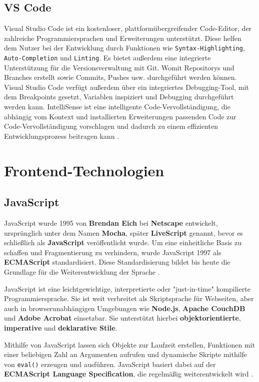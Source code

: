 \documentclass[oneside]{ausarbeitung}
\begin{document}
\subsection{VS Code}
Visual Studio Code ist ein kostenloser, plattformübergreifender Code-Editor, der zahlreiche Programmiersprachen und Erweiterungen unterstützt. Diese helfen dem Nutzer bei der Entwicklung durch Funktionen wie \texttt{Syntax-Highlighting}, \texttt{Auto-Completion} und \texttt{Linting}.
Es bietet außerdem eine integrierte Unterstützung für die Versionsverwaltung mit Git. Womit Repositorys und Branches erstellt sowie Commits, Pushes usw. durchgeführt werden können.
Visual Studio Code verfügt außerdem über ein integriertes Debugging-Tool, mit dem Breakpoints gesetzt, Variablen inspiziert und Debugging durchgeführt werden kann.
IntelliSense ist eine intelligente Code-Vervollständigung, die abhängig vom Kontext und installierten Erweiterungen passenden Code zur Code-Vervollständigung vorschlagen und dadurch zu einem effizienten Entwicklungsprozess beitragen kann \parencite{vs-code}.

\section{Frontend-Technologien}

\subsection{JavaScript}

JavaScript wurde 1995 von \textbf{Brendan Eich} bei \textbf{Netscape} entwickelt, ursprünglich unter dem Namen \textbf{Mocha}, später \textbf{LiveScript} genannt, bevor es schließlich als \textbf{JavaScript} veröffentlicht wurde. Um eine einheitliche Basis zu schaffen und Fragmentierung zu verhindern, wurde JavaScript 1997 als \textbf{ECMAScript} standardisiert. Diese Standardisierung bildet bis heute die Grundlage für die Weiterentwicklung der Sprache \parencite{w3schoolsJS}.  

JavaScript ist eine leichtgewichtige, interpretierte oder "just-in-time" kompilierte Programmiersprache. Sie ist weit verbreitet als Skriptsprache für Webseiten, aber auch in browserunabhängigen Umgebungen wie \textbf{Node.js}, \textbf{Apache CouchDB} und \textbf{Adobe Acrobat} einsetzbar. Sie unterstützt hierbei \textbf{objektorientierte}, \textbf{imperative} und \textbf{deklarative Stile}.  

Mithilfe von JavaScript lassen sich Objekte zur Laufzeit erstellen, Funktionen mit einer beliebigen Zahl an Argumenten aufrufen und dynamische Skripte mithilfe von \texttt{eval()} erzeugen und ausführen. JavaScript basiert dabei auf der \textbf{ECMAScript Language Specification}, die regelmäßig weiterentwickelt wird \parencite{mdn-JS}.  
\end{document}
